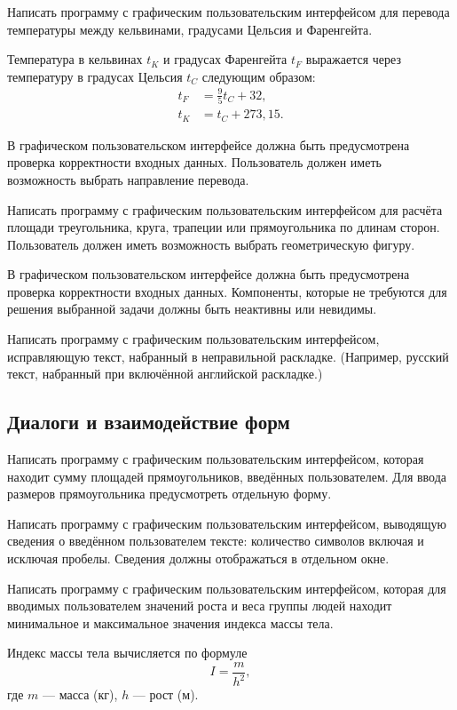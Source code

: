 \task Написать программу с графическим пользовательским интерфейсом
для перевода температуры между кельвинами, градусами Цельсия и
Фаренгейта.

Температура в кельвинах $t_K$ и градусах Фаренгейта $t_F$ выражается
через температуру в градусах Цельсия $t_C$ следующим образом:
\begin{align*}
  t_F &= \frac95 t_C + 32,\\
  t_K &= t_C + 273{,}15.
\end{align*}

В графическом пользовательском интерфейсе должна быть предусмотрена
проверка корректности входных данных. Пользователь должен иметь
возможность выбрать направление перевода.

\task Написать программу с графическим пользовательским интерфейсом
для расчёта площади треугольника, круга, трапеции или прямоугольника
по длинам сторон. Пользователь должен иметь возможность выбрать
геометрическую фигуру.

В графическом пользовательском интерфейсе должна быть предусмотрена
проверка корректности входных данных. Компоненты, которые не требуются
для решения выбранной задачи должны быть неактивны или невидимы.

\task Написать программу с графическим пользовательским интерфейсом,
исправляющую текст, набранный в неправильной
раскладке. (Например, русский текст,
набранный при включённой английской раскладке.)


\subsection{Диалоги и взаимодействие форм}

\task Написать программу с графическим пользовательским интерфейсом,
которая находит сумму площадей прямоугольников, введённых
пользователем. Для ввода размеров прямоугольника предусмотреть
отдельную форму.

\task Написать программу с графическим пользовательским интерфейсом,
выводящую сведения о введённом пользователем тексте: количество
символов включая и исключая пробелы. Сведения должны отображаться в
отдельном окне.

\task Написать программу с графическим пользовательским интерфейсом,
которая для вводимых пользователем значений роста и веса группы людей
находит минимальное и максимальное значения индекса массы тела.

Индекс массы тела вычисляется по формуле
\[
I=\frac{m}{h^2},
\]
где $m$ — масса (кг), $h$ — рост (м).

